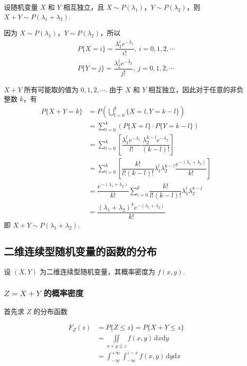 \begin{conclusion}
    设随机变量 $X$ 和 $Y$ 相互独立，且 $X \sim P(\lambda_1)$，$Y \sim P(\lambda_2)$，则 $X+Y \sim P(\lambda_1 + \lambda_2)$.
\end{conclusion}

\begin{myproof}
    因为 $X \sim P(\lambda_1)$，$Y \sim P(\lambda_2)$，所以
    \begin{gather*}
        P\{X=i\} = \dfrac{\lambda_1^i e^{-\lambda_1}}{i!},\ i=0,1,2,\cdots \\[0.5em]
        P\{Y=j\} = \dfrac{\lambda_2^j e^{-\lambda_2}}{j!},\ j=0,1,2,\cdots
    \end{gather*}

    $X+Y$ 所有可能取的值为 $0,1,2,\cdots$. 由于 $X$ 和 $Y$ 相互独立，因此对于任意的非负整数 $k$，有
    $$
    \begin{aligned}
        P\{X+Y=k\} &= P(\bigcup_{l=0}^k \{X=l, Y=k-l\}) \\
        &= \sum_{l=0}^k (P\{X=l\} \cdot P\{Y=k-l\}) \\
        &= \sum_{l=0}^k \left[ \dfrac{\lambda_1^l e^{-\lambda_1}}{l!} \dfrac{\lambda_2^{k-l} e^{-\lambda_2}}{(k-l)!} \right] \\
        &= \sum_{l=0}^k \left[ \dfrac{k!}{l!(k-l)!} \lambda_1^l \lambda_2^{k-l} \dfrac{e^{-(\lambda_1 + \lambda_2)}}{k!} \right] \\
        &= \dfrac{e^{-(\lambda_1 + \lambda_2)}}{k!} \sum_{i=0}^k \dfrac{k!}{l!(k-l)!} \lambda_1^l \lambda_2^{k-l} \\
        &= \dfrac{(\lambda_1 + \lambda_2)^k e^{-(\lambda_1 + \lambda_2)}}{k!}
    \end{aligned}
    $$
    即 $X+Y \sim P(\lambda_1 + \lambda_2)$.
\end{myproof}

\subsection{二维连续型随机变量的函数的分布}

设 $(X,Y)$ 为二维连续型随机变量，其概率密度为 $f(x,y)$.

\subsubsection{$Z=X+Y$ 的概率密度}

首先求 $Z$ 的分布函数

$$
\begin{aligned}
    F_{Z}(z) &= P\{Z \leqslant z\} = P\{X+Y \leqslant z\} \\
    &= \underset{x+y \leqslant z}{\iint} f(x,y) \, \text{d}x \text{d}y \\
    &= \int_{-\infty}^{+\infty} \int_{-\infty}^{z-x} f(x,y) \, \text{d}y \text{d}x \\
\end{aligned}
$$

